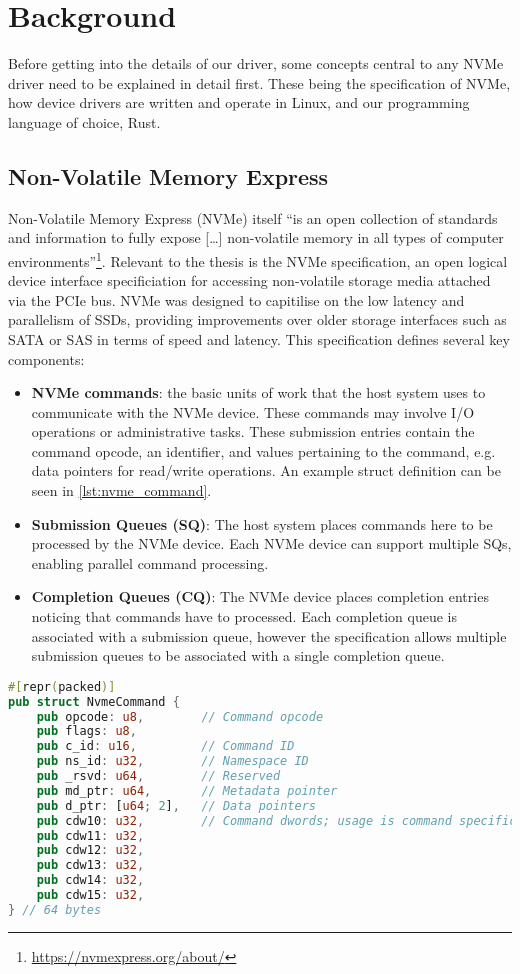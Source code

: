 \chapter{Background}\label{chapter:basics}

Before getting into the details of our driver, some concepts central to any NVMe driver need to be explained in detail first. These being the specification of NVMe, how device drivers are written and operate in Linux, and our programming language of choice, Rust.

\section{Non-Volatile Memory Express}
Non-Volatile Memory Express (NVMe) itself ``is an open collection of standards and information to fully expose [\ldots] non-volatile memory in all types of computer environments''\footnote{\url{https://nvmexpress.org/about/}}. Relevant to the thesis is the NVMe specification, an open logical device interface specificiation for accessing non-volatile storage media attached via the PCIe bus. NVMe was designed to capitilise on the low latency and parallelism of SSDs, providing improvements over older storage interfaces such as SATA or SAS in terms of speed and latency. This specification defines several key components:
\begin{itemize}
        \item \textbf{NVMe commands}: the basic units of work that the host system uses to communicate with the NVMe device. These commands may involve I/O operations or administrative tasks. These submission entries contain the command opcode, an identifier, and values pertaining to the command, e.g. data pointers for read/write operations. An example struct definition can be seen in \autoref{lst:nvme_command}.
        \item \textbf{Submission Queues (SQ)}: The host system places commands here to be processed by the NVMe device. Each NVMe device can support multiple SQs, enabling parallel command processing.
        \item \textbf{Completion Queues (CQ)}: The NVMe device places completion entries noticing that commands have to processed. Each completion queue is associated with a submission queue, however the specification allows multiple submission queues to be associated with a single completion queue.
\end{itemize}

\begin{lstlisting}[float,language=Rust,label=lst:nvme_command,caption=NVMe command defined as a struct in Rust]
#[repr(packed)]
pub struct NvmeCommand {
    pub opcode: u8,        // Command opcode
    pub flags: u8,
    pub c_id: u16,         // Command ID
    pub ns_id: u32,        // Namespace ID
    pub _rsvd: u64,        // Reserved
    pub md_ptr: u64,       // Metadata pointer
    pub d_ptr: [u64; 2],   // Data pointers
    pub cdw10: u32,        // Command dwords; usage is command specific
    pub cdw11: u32,
    pub cdw12: u32,
    pub cdw13: u32,
    pub cdw14: u32,
    pub cdw15: u32,
} // 64 bytes
\end{lstlisting}

